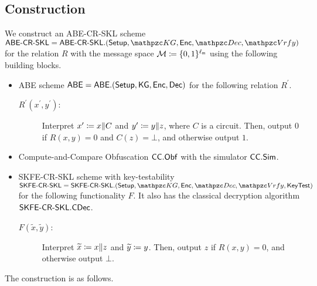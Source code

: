 \subsection{Construction}
We construct an ABE-CR-SKL scheme
$\ABESKL=\ABESKL.(\Setup,\qKG,\allowbreak\Enc,\qDec,\qVrfy)$ for the relation
$R$ with the message space $\mathcal{M} \coloneqq \{0,1\}^{\ell_{\mathsf{m}}}$ using the following building blocks.
\begin{itemize}
\item ABE scheme $\mathsf{ABE}=\mathsf{ABE}.(\mathsf{Setup},\mathsf{KG},\mathsf{Enc},\mathsf{Dec})$ for the following relation $R^\prime$.
\begin{description}
\item[$R^\prime(x^\prime,y^\prime)$:]Interpret $x^\prime\coloneqq x\|C$ and
    $y^\prime\coloneqq y\|z$, where $C$ is a circuit. Then, output $0$ if
    $R(x,y)=0$ and $C(z)=\bot$, and otherwise output $1$.
\end{description}

\item Compute-and-Compare Obfuscation $\mathsf{CC}.\mathsf{Obf}$ with the simulator $\mathsf{CC}.\mathsf{Sim}$.
\item SKFE-CR-SKL scheme with key-testability
$\SKFESKL=\SKFESKL.\allowbreak(\Setup,\qKG,\Enc,\qDec,\qVrfy,\allowbreak\KeyTest)$ for
the following functionality $F$. It also has the classical
decryption algorithm $\mathsf{SKFE}\textrm{-}\mathsf{CR}\textrm{-}\mathsf{SKL}.\mathsf{CDec}$.

\begin{description}
\item[$F(\widetilde{x},\widetilde{y})$:]Interpret
    $\widetilde{x}\coloneqq x\|z$ and $\widetilde{y}\coloneqq y$. Then, output $z$
    if $R(x,y)=0$, and otherwise output $\bot$.
\end{description}

\end{itemize} 

The construction is as follows.

